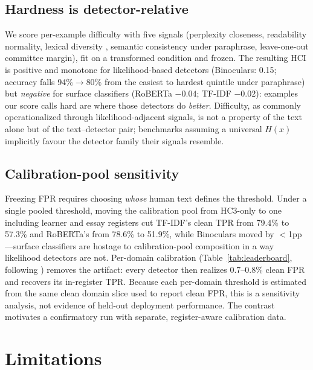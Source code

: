 \documentclass[11pt]{article}
\begin{document}
\subsection{Hardness is detector-relative}
\label{sec:hardness}

We score per-example difficulty with five signals (perplexity closeness,
readability normality, lexical diversity \citep{mccarthy2010mtld}, semantic
consistency under paraphrase, leave-one-out committee margin), fit on a
transformed condition and frozen. The resulting HCI is positive and monotone
for likelihood-based detectors (Binoculars: 0.15; accuracy falls
94\%$\to$80\% from the easiest to hardest quintile under paraphrase) but
\emph{negative} for
surface classifiers (RoBERTa $-0.04$; TF-IDF $-0.02$): examples our score
calls hard are where those detectors do \emph{better}. Difficulty, as commonly
operationalized through likelihood-adjacent signals, is not a property of the
text alone but of the text--detector pair; benchmarks assuming a universal
$H(x)$ implicitly favour the detector family their signals resemble.

\subsection{Calibration-pool sensitivity}
\label{sec:calibration}

Freezing FPR requires choosing \emph{whose} human text defines the threshold.
Under a single pooled threshold, moving the calibration pool from HC3-only to
one including learner and essay registers cut TF-IDF's clean TPR from 79.4\%
to 57.3\% and RoBERTa's from 78.6\% to 51.9\%, while Binoculars moved by
$<$1pp---surface classifiers are hostage to calibration-pool composition in a
way likelihood detectors are not. Per-domain calibration
(Table~\ref{tab:leaderboard}, following \citealp{dugan2024raid}) removes the
artifact: every detector then realizes 0.7--0.8\% clean FPR and recovers its
in-register TPR. Because each per-domain threshold is estimated from the same
clean domain slice used to report clean FPR, this is a sensitivity analysis,
not evidence of held-out deployment performance. The contrast motivates a
confirmatory run with separate, register-aware calibration data.

\section{Limitations}
\label{sec:limitations}
\end{document}
